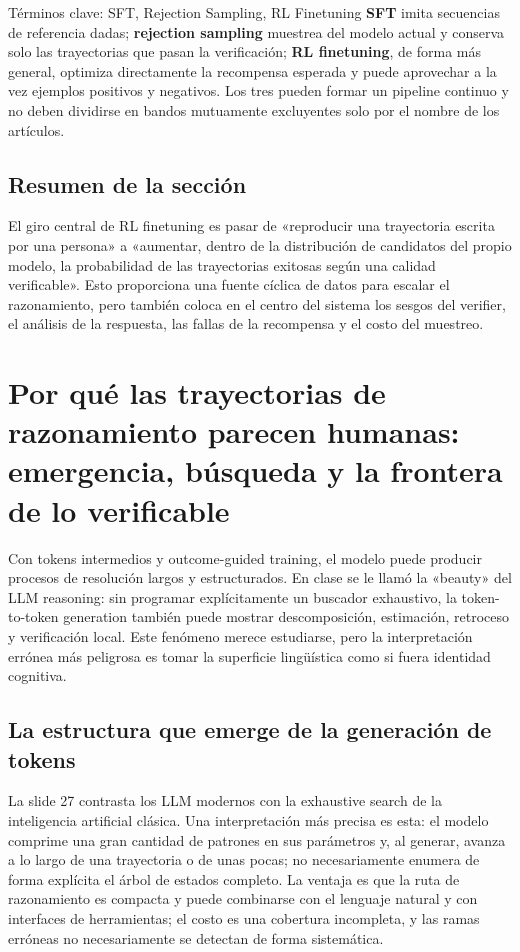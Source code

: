 \documentclass[a4paper]{article}
\begin{document}
\begin{knowledgebox}{Términos clave: SFT, Rejection Sampling, RL Finetuning}
\textbf{SFT} imita secuencias de referencia dadas; \textbf{rejection sampling} muestrea del modelo actual y conserva solo las trayectorias que pasan la verificación; \textbf{RL finetuning}, de forma más general, optimiza directamente la recompensa esperada y puede aprovechar a la vez ejemplos positivos y negativos. Los tres pueden formar un pipeline continuo y no deben dividirse en bandos mutuamente excluyentes solo por el nombre de los artículos.
\end{knowledgebox}

\subsection{Resumen de la sección}

El giro central de RL finetuning es pasar de «reproducir una trayectoria escrita por una persona» a «aumentar, dentro de la distribución de candidatos del propio modelo, la probabilidad de las trayectorias exitosas según una calidad verificable». Esto proporciona una fuente cíclica de datos para escalar el razonamiento, pero también coloca en el centro del sistema los sesgos del verifier, el análisis de la respuesta, las fallas de la recompensa y el costo del muestreo.
\section{Por qué las trayectorias de razonamiento parecen humanas: emergencia, búsqueda y la frontera de lo verificable}

Con tokens intermedios y outcome-guided training, el modelo puede producir procesos de resolución largos y estructurados. En clase se le llamó la «beauty» del LLM reasoning: sin programar explícitamente un buscador exhaustivo, la token-to-token generation también puede mostrar descomposición, estimación, retroceso y verificación local. Este fenómeno merece estudiarse, pero la interpretación errónea más peligrosa es tomar la superficie lingüística como si fuera identidad cognitiva.

\subsection{La estructura que emerge de la generación de tokens}

La slide 27 contrasta los LLM modernos con la exhaustive search de la inteligencia artificial clásica. Una interpretación más precisa es esta: el modelo comprime una gran cantidad de patrones en sus parámetros y, al generar, avanza a lo largo de una trayectoria o de unas pocas; no necesariamente enumera de forma explícita el árbol de estados completo. La ventaja es que la ruta de razonamiento es compacta y puede combinarse con el lenguaje natural y con interfaces de herramientas; el costo es una cobertura incompleta, y las ramas erróneas no necesariamente se detectan de forma sistemática.
\end{document}
